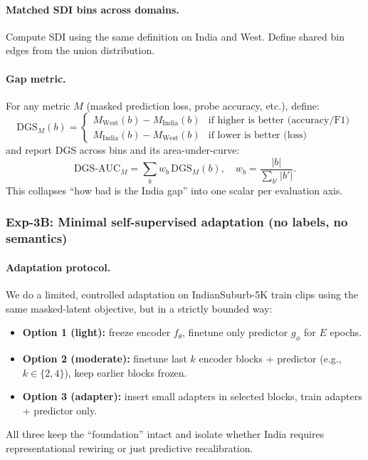 \paragraph{Matched SDI bins across domains.}
Compute SDI using the same definition on India and West. Define shared bin edges from the union distribution.

\paragraph{Gap metric.}
For any metric $M$ (masked prediction loss, probe accuracy, etc.), define:
\[
\mathrm{DGS}_M(b) = 
\begin{cases}
M_{\mathrm{West}}(b) - M_{\mathrm{India}}(b) & \text{if higher is better (accuracy/F1)}\\
M_{\mathrm{India}}(b) - M_{\mathrm{West}}(b) & \text{if lower is better (loss)}
\end{cases}
\]
and report DGS across bins and its area-under-curve:
\[
\mathrm{DGS\text{-}AUC}_M = \sum_{b} w_b \,\mathrm{DGS}_M(b),
\quad w_b = \frac{|b|}{\sum_{b'} |b'|}.
\]
This collapses “how bad is the India gap” into one scalar per evaluation axis.

\subsubsection{Exp-3B: Minimal self-supervised adaptation (no labels, no semantics)}

\paragraph{Adaptation protocol.}
We do a limited, controlled adaptation on IndianSuburb-5K train clips using the same masked-latent objective, but in a strictly bounded way:
\begin{itemize}[leftmargin=*,itemsep=2pt]
  \item \textbf{Option 1 (light):} freeze encoder $f_{\theta}$, finetune only predictor $g_{\phi}$ for $E$ epochs.
  \item \textbf{Option 2 (moderate):} finetune last $k$ encoder blocks + predictor (e.g., $k\in\{2,4\}$), keep earlier blocks frozen.
  \item \textbf{Option 3 (adapter):} insert small adapters in selected blocks, train adapters + predictor only.
\end{itemize}
All three keep the “foundation” intact and isolate whether India requires representational rewiring or just predictive recalibration.

